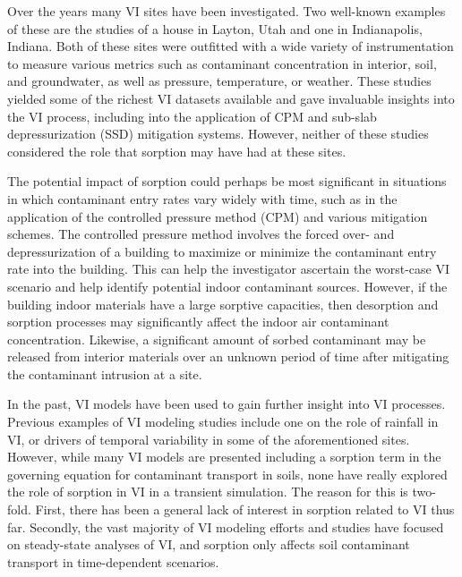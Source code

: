 Over the years many VI sites have been investigated.
Two well-known examples of these are the studies of a house in Layton, Utah and one in Indianapolis, Indiana.
Both of these sites were outfitted with a wide variety of instrumentation to measure various metrics such as contaminant concentration in interior, soil, and groundwater, as well as pressure, temperature, or weather.
These studies yielded some of the richest VI datasets available and gave invaluable insights into the VI process, including into the application of CPM\cite{holton_long-term_2015} and sub-slab depressurization (SSD) mitigation systems\cite{lutes_comparing_2015,u.s._environmental_protection_agency_assessment_2015}.
However, neither of these studies considered the role that sorption may have had at these sites.\par

The potential impact of sorption could perhaps be most significant in situations in which contaminant entry rates vary widely with time, such as in the application of the controlled pressure method (CPM) and various mitigation schemes.
The controlled pressure method involves the forced over- and depressurization of a building to maximize or minimize the contaminant entry rate into the building.
This can help the investigator ascertain the worst-case VI scenario and help identify potential indoor contaminant sources\cite{mchugh_recent_2017,holton_long-term_2015}.
However, if the building indoor materials have a large sorptive capacities, then desorption and sorption processes may significantly affect the indoor air contaminant concentration.
Likewise, a significant amount of sorbed contaminant may be released from interior materials over an unknown period of time after mitigating the contaminant intrusion at a site\cite{meininghaus_diffusion_2000,meininghaus_diffusion_2002}.\par

In the past, VI models have been used to gain further insight into VI processes\cite{johnson_heuristic_1991,little_transport_1992,shirazi_three-dimensional_2017}.
Previous examples of VI modeling studies include one on the role of rainfall in VI\cite{shen_numerical_2012}, or drivers of temporal variability in some of the aforementioned sites\cite{strom_factors_2019}.
However, while many VI models are presented including a sorption term in the governing equation for contaminant transport in soils, none have really explored the role of sorption in VI in a transient simulation.
The reason for this is two-fold.
First, there has been a general lack of interest in sorption related to VI thus far.
Secondly, the vast majority of VI modeling efforts and studies have focused on steady-state analyses of VI, and sorption only affects soil contaminant transport in time-dependent scenarios.\par

